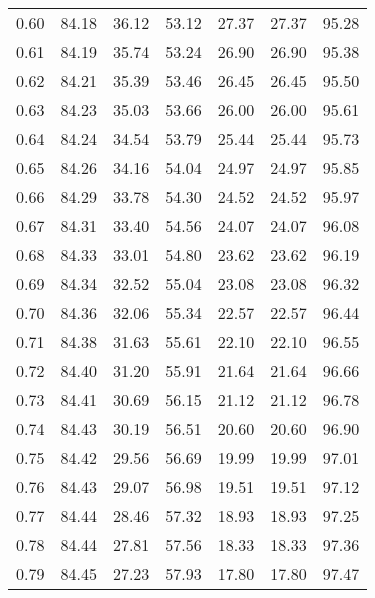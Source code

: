 \begin{tabular}{|c|c|c|c|c|c|c|}
      0.60 &     84.18 &     36.12 &      53.12 &   27.37 &      27.37 &         95.28 \\
      0.61 &     84.19 &     35.74 &      53.24 &   26.90 &      26.90 &         95.38 \\
      0.62 &     84.21 &     35.39 &      53.46 &   26.45 &      26.45 &         95.50 \\
      0.63 &     84.23 &     35.03 &      53.66 &   26.00 &      26.00 &         95.61 \\
      0.64 &     84.24 &     34.54 &      53.79 &   25.44 &      25.44 &         95.73 \\
      0.65 &     84.26 &     34.16 &      54.04 &   24.97 &      24.97 &         95.85 \\
      0.66 &     84.29 &     33.78 &      54.30 &   24.52 &      24.52 &         95.97 \\
      0.67 &     84.31 &     33.40 &      54.56 &   24.07 &      24.07 &         96.08 \\
      0.68 &     84.33 &     33.01 &      54.80 &   23.62 &      23.62 &         96.19 \\
      0.69 &     84.34 &     32.52 &      55.04 &   23.08 &      23.08 &         96.32 \\
      0.70 &     84.36 &     32.06 &      55.34 &   22.57 &      22.57 &         96.44 \\
      0.71 &     84.38 &     31.63 &      55.61 &   22.10 &      22.10 &         96.55 \\
      0.72 &     84.40 &     31.20 &      55.91 &   21.64 &      21.64 &         96.66 \\
      0.73 &     84.41 &     30.69 &      56.15 &   21.12 &      21.12 &         96.78 \\
      0.74 &     84.43 &     30.19 &      56.51 &   20.60 &      20.60 &         96.90 \\
      0.75 &     84.42 &     29.56 &      56.69 &   19.99 &      19.99 &         97.01 \\
      0.76 &     84.43 &     29.07 &      56.98 &   19.51 &      19.51 &         97.12 \\
      0.77 &     84.44 &     28.46 &      57.32 &   18.93 &      18.93 &         97.25 \\
      0.78 &     84.44 &     27.81 &      57.56 &   18.33 &      18.33 &         97.36 \\
      0.79 &     84.45 &     27.23 &      57.93 &   17.80 &      17.80 &         97.47 \\

\end{tabular}
